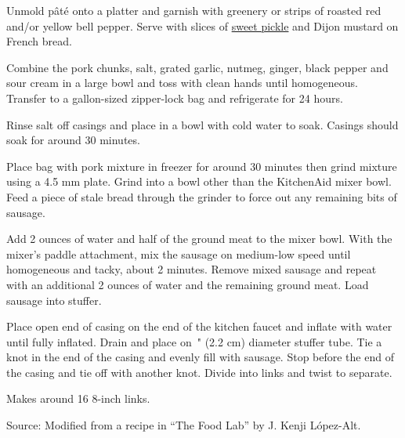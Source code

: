 \documentclass[letterpaper]{recipePMG}
\newcommand{\seveneights}{\nicefrac{7}{8} \,}
\begin{document}
Unmold p\^{a}t\'{e} onto a platter
and garnish with greenery or strips of roasted red and/or yellow
bell pepper.  Serve with slices of \hyperref[SweetPickles]{sweet pickle} and Dijon mustard
on French bread.

\newpage
{}
\label{Bratwurst}


Combine the pork chunks, salt, grated garlic, nutmeg, ginger, black pepper and sour cream  in a large bowl and toss with clean hands until homogeneous. Transfer to a gallon-sized zipper-lock bag and refrigerate for 24 hours.

Rinse salt off casings and place in a bowl with cold water to soak.  Casings should soak for around 30 minutes.

Place bag with pork mixture in freezer for around 30 minutes then grind mixture using a 4.5 mm plate. Grind into a bowl other than the KitchenAid mixer bowl. Feed a piece of stale bread through the grinder to force out any remaining bits of sausage. 


Add 2 ounces of water and half of the ground meat to the mixer bowl. With the mixer's paddle attachment, mix the sausage on medium-low speed until homogeneous and tacky, about 2 minutes. Remove mixed sausage and repeat with an additional 2 ounces of water and the remaining ground meat. Load sausage into stuffer. 

Place open end of casing on the end of the kitchen faucet and inflate with water until fully inflated. Drain and place on \seveneights" (2.2 cm) diameter stuffer tube. Tie a knot in the end of the casing and evenly fill with sausage. Stop before the end of the casing and tie off with another knot.  Divide into links and twist to separate. 

Makes around 16 8-inch links.

Source: Modified from a recipe in ``The Food Lab'' by J. Kenji L\'{o}pez-Alt.

\newpage
{}
\label{TexasSausage}
\end{document}
